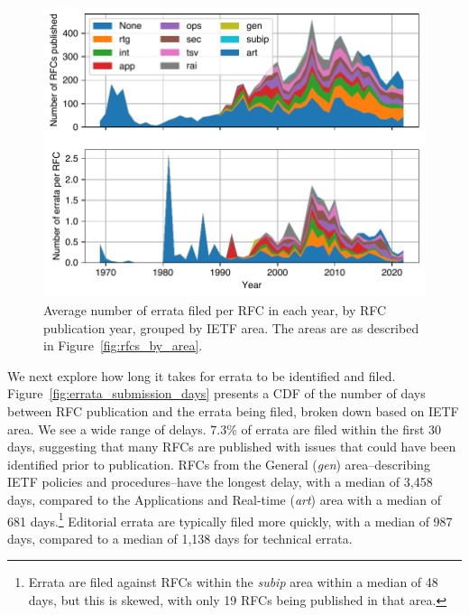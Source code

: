 \documentclass[twocolumn,10pt]{article}
\newlength{\figureWidthOneColumn}
\newcommand{\pb}[1]{\vspace{0.75ex}\noindent{\textbf{#1}}}
\begin{document}
\begin{figure}
  \centering
  \includegraphics[width=\figureWidthOneColumn]{figures-prev/tma-2023/errata-by-year.pdf}
  \caption{
    Average number of errata filed per RFC in each year, by RFC publication year,
    grouped by IETF area. The areas are as described in Figure~\ref{fig:rfcs_by_area}.
  }
  \label{fig:errata_per_year}
\end{figure}




\pb{Errata Delay:}
We next explore how long it takes for errata to be identified and filed.
Figure~\ref{fig:errata_submission_days} presents a CDF of the number of
days between RFC publication and the errata being filed, broken down based
on IETF area. We see a wide range of delays. 7.3\% of errata are filed
within the first 30 days, suggesting that many RFCs are published with
issues that could have been identified prior to publication.  RFCs from the
General (\emph{gen}) area--describing IETF policies and procedures--have
the longest delay, with a median of 3,458 days, compared to the
Applications and Real-time (\emph{art}) area with a median of 681
days.\footnote{Errata are filed against RFCs within the \emph{subip} area
within a median of 48 days, but this is skewed, with only 19 RFCs being
published in that area.} Editorial errata are typically filed more quickly,
with a median of 987 days, compared to a median of 1,138 days for technical
errata. 
\end{document}
